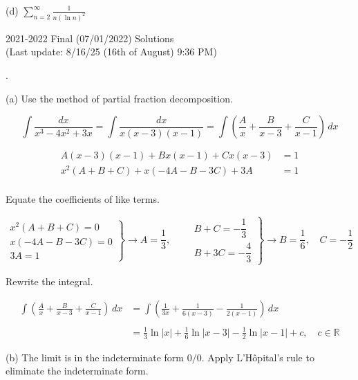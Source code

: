 \documentclass{article}
\begin{document}
\hfill

\hfill

\noindent (d) $\displaystyle\sum_{n=2}^\infty\frac1{n(\ln n)^2}$

\newpage

\begin{center}
2021-2022 Final (07/01/2022) Solutions\\
(Last update: 8/16/25 (16th of August) 9:36 PM)
\end{center}

.

\hfill

\noindent (a) Use the method of partial fraction decomposition.

\[\int\frac{dx}{x^3-4x^2+3x}=\int\frac{dx}{x(x-3)(x-1)}=\int\left(\frac Ax+\frac B{x-3}+\frac C{x-1}\right)\,dx\]

\[\begin{array}{rc}A(x-3)(x-1)+Bx(x-1)+Cx(x-3)&=1\\x^2(A+B+C)+x(-4A-B-3C)+3A&=1\\&\end{array}\]

\hfill

\noindent Equate the coefficients of like terms.

\[\left.\begin{array}{r}
x^2(A+B+C)=0\\
x(-4A-B-3C)=0\\
3A=1
\end{array}\right\}\rightarrow A=\frac13,\qquad\left.\begin{array}{r}
B+C=-\dfrac13\\[1em]
B+3C=-\dfrac43
\end{array}\right\}\rightarrow B=\frac16,\quad C=-\frac12\]

\hfill

\noindent Rewrite the integral.

\begin{align*}
\int\left(\frac Ax+\frac B{x-3}+\frac C{x-1}\right)\,dx&=\int\left(\frac1{3x}+\frac1{6(x-3)}-\frac1{2(x-1)}\right)\,dx\\\\&=\boxed{\frac13\ln|x|+\frac16\ln|x-3|-\frac12\ln|x-1|+c,\quad c\in\mathbb{R}}
\end{align*}

\hfill

\noindent (b) The limit is in the indeterminate form $0/0$. Apply L'Hôpital's rule to eliminate the indeterminate form.
\end{document}
